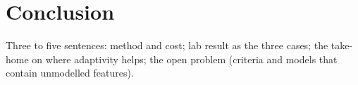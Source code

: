 \section{Conclusion}\label{sec:conclusion}
\begin{notes}
\item Three to five sentences: method and cost; lab result as the three cases; the take-home on where adaptivity helps; the open problem (criteria and models that contain unmodelled features).
\end{notes}
